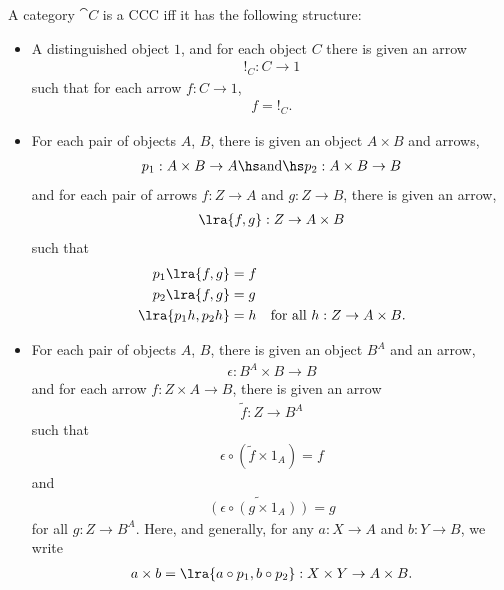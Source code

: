 \documentclass{article}
\begin{document}
\begin{proposition}[Awodey p. 134]
	A category $\cat C$ is a CCC iff it has the following structure:

	\begin{itemize}
		\item A distinguished object $1$, and for each object $C$ there
		      is given an arrow \begin{align*}
			      !_C:C\to 1
		      \end{align*}
		      such that for each arrow $f:C\to 1$, \begin{align*}
			      f=!_C.
		      \end{align*}
		\item For each pair of objects $A$, $B$, there is given an object
		      $A\times B$ and arrows, \begin{align*}
			      p_1:A\times B \to A\hs\text{and}\hs p_2:A\times B\to B
		      \end{align*}
		      and for each pair of arrows $f:Z\to A$ and $g:Z\to B$, there is given
		      an arrow, \begin{align*}
			      \lra{f,g}:Z\to A\times B
		      \end{align*}
		      such that \begin{align*}
			      p_1\lra{f,g}    & =f                                    \\
			      p_2\lra{f,g}    & =g                                    \\
			      \lra{p_1h,p_2h} & =h & \text{for all }h:Z\to A\times B.
		      \end{align*}
		\item For each pair of objects $A$, $B$, there is given an object
		      $B^A$ and an arrow, \begin{align*}
			      \epsilon : B^A\times B \to B
		      \end{align*}
		      and for each arrow $f:Z\times A \to B$, there is given an arrow \begin{align*}
			      \tilde{f}:Z\to B^A
		      \end{align*}
		      such that \begin{align*}
			      \epsilon\circ(\tilde f \times 1_A)=f
		      \end{align*}
		      and \begin{align*}
			      \widetilde{(\epsilon\circ(g\times 1_A))}=g
		      \end{align*}
		      for all $g:Z\to B^A$. Here, and generally, for any $a:X\to A$ and
		      $b:Y\to B$, we write
		      \begin{align*}
			      a\times b = \lra{a\circ p_1, b\circ p_2}:X\times Y\to A\times B.
		      \end{align*}
	\end{itemize}
\end{proposition}
\end{document}
